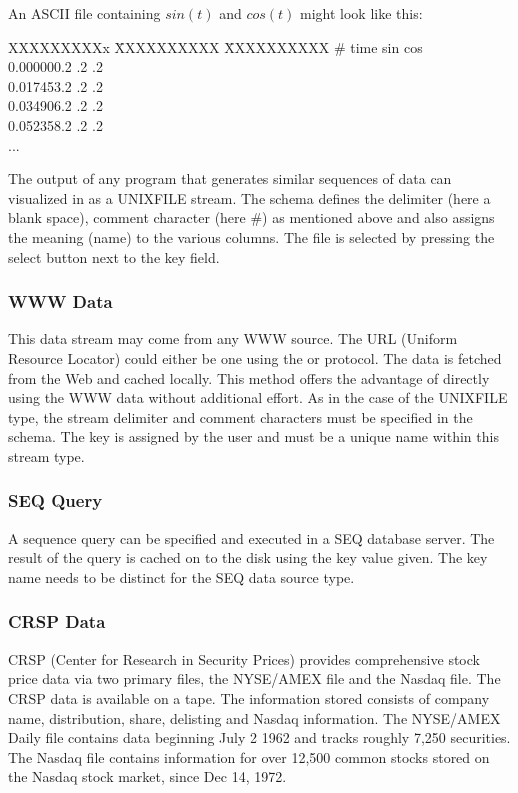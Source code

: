 An ASCII file containing $sin(t)$ and $cos(t)$ might look like this:

\begin{tabbing}
XXXXXXXXXx \= XXXXXXXXXX \= XXXXXXXXXX \kill
\#  time \> sin \> cos \\
0.000000.2 .2 .2 \\
0.017453.2 .2 .2 \\
0.034906.2 .2 .2 \\
0.052358.2 .2 .2 \\
... 
\end{tabbing}

The output of any program that generates similar sequences of data can
visualized in \Devise as a UNIXFILE stream. The schema defines the
delimiter (here a blank space), comment character (here \#) as
mentioned above and also assigns the meaning (name) to the various
columns. The file is selected by pressing the select button next to
the key field.

\subsubsection{WWW Data}

This data stream may come from any WWW source. The URL (Uniform
Resource Locator) could either be one using the  or
 protocol. The data is fetched from the Web and cached
locally. This method offers the advantage of directly using the WWW
data without additional effort. As in the case of the UNIXFILE type,
the stream delimiter and comment characters must be specified in the
schema. The key is assigned by the user and must be a unique name
within this stream type.

\subsubsection{SEQ Query}

A sequence query can be specified and executed in a SEQ database
server.  The result of the query is cached on to the disk using the
key value given. The key name needs to be distinct for the SEQ data
source type.

\subsubsection{CRSP Data}

CRSP (Center for Research in Security Prices) provides comprehensive
stock price data via two primary files, the NYSE/AMEX file and the
Nasdaq file. The CRSP data is available on a tape. The information
stored consists of company name, distribution, share, delisting and
Nasdaq information. The NYSE/AMEX Daily file contains data beginning
July 2 1962 and tracks roughly 7,250 securities. The Nasdaq file
contains information for over 12,500 common stocks stored on the
Nasdaq stock market, since Dec 14, 1972.

